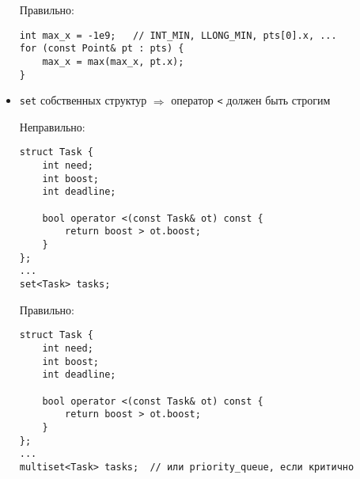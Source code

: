 \begin{itemize}
Правильно:

\begin{verbatim}
int max_x = -1e9;   // INT_MIN, LLONG_MIN, pts[0].x, ...
for (const Point& pt : pts) {
    max_x = max(max_x, pt.x);
}
\end{verbatim}

\item \texttt{set} собственных структур $\Rightarrow$ оператор \texttt{<} должен быть строгим

Неправильно:

\begin{verbatim}
struct Task {
    int need;
    int boost;
    int deadline;

    bool operator <(const Task& ot) const {
        return boost > ot.boost;
    }
};
...
set<Task> tasks;
\end{verbatim}

Правильно:

\begin{verbatim}
struct Task {
    int need;
    int boost;
    int deadline;

    bool operator <(const Task& ot) const {
        return boost > ot.boost;
    }
};
...
multiset<Task> tasks;  // или priority_queue, если критично
\end{verbatim}
\end{itemize}
